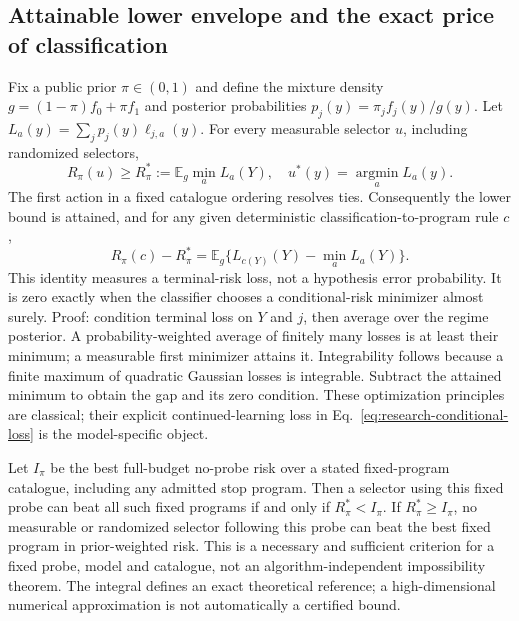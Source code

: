 \subsection{Attainable lower envelope and the exact price of classification}
Fix a public prior $\pi\in(0,1)$ and define the mixture density $g=(1-\pi)f_0+\pi f_1$ and posterior probabilities $p_j(y)=\pi_jf_j(y)/g(y)$.
Let $L_a(y)=\sum_jp_j(y)\ell_{j,a}(y)$.
For every measurable selector $u$, including randomized selectors,
\begin{equation}
R_\pi(u)\ge R_\pi^*:=\mathbb E_g\min_a L_a(Y),\quad
u^*(y)=\operatorname*{argmin}_aL_a(y).
\label{eq:research-envelope}
\end{equation}
The first action in a fixed catalogue ordering resolves ties.
Consequently the lower bound is attained, and for any given deterministic classification-to-program rule $c$,
\begin{equation}
R_\pi(c)-R_\pi^*=
\mathbb E_g\{L_{c(Y)}(Y)-\min_aL_a(Y)\}.
\label{eq:research-classification-gap}
\end{equation}
This identity measures a terminal-risk loss, not a hypothesis error probability.
It is zero exactly when the classifier chooses a conditional-risk minimizer almost surely.
Proof: condition terminal loss on $Y$ and $j$, then average over the regime posterior.
A probability-weighted average of finitely many losses is at least their minimum; a measurable first minimizer attains it.
Integrability follows because a finite maximum of quadratic Gaussian losses is integrable.
Subtract the attained minimum to obtain the gap and its zero condition.
These optimization principles are classical; their explicit continued-learning loss in Eq.~\eqref{eq:research-conditional-loss} is the model-specific object.

Let $I_\pi$ be the best full-budget no-probe risk over a stated fixed-program catalogue, including any admitted stop program.
Then a selector using this fixed probe can beat all such fixed programs if and only if $R_\pi^*<I_\pi$.
If $R_\pi^*\ge I_\pi$, no measurable or randomized selector following this probe can beat the best fixed program in prior-weighted risk.
This is a necessary and sufficient criterion for a fixed probe, model and catalogue, not an algorithm-independent impossibility theorem.
The integral defines an exact theoretical reference; a high-dimensional numerical approximation is not automatically a certified bound.

